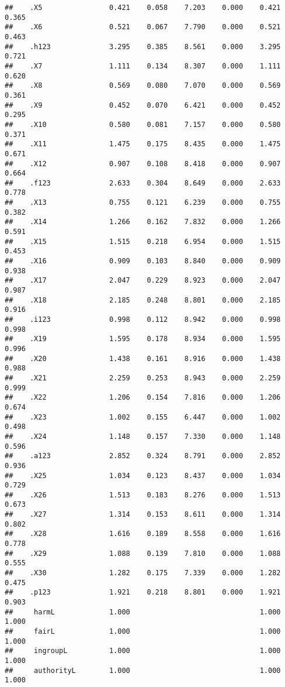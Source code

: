 \documentclass[english,man]{apa6}
\newcounter{author}
\theoremstyle{definition}
\theoremstyle{definition}
\theoremstyle{definition}
\theoremstyle{remark}
\begin{document}
\begin{verbatim}
##    .X5                0.421    0.058    7.203    0.000    0.421    0.365
##    .X6                0.521    0.067    7.790    0.000    0.521    0.463
##    .h123              3.295    0.385    8.561    0.000    3.295    0.721
##    .X7                1.111    0.134    8.307    0.000    1.111    0.620
##    .X8                0.569    0.080    7.070    0.000    0.569    0.361
##    .X9                0.452    0.070    6.421    0.000    0.452    0.295
##    .X10               0.580    0.081    7.157    0.000    0.580    0.371
##    .X11               1.475    0.175    8.435    0.000    1.475    0.671
##    .X12               0.907    0.108    8.418    0.000    0.907    0.664
##    .f123              2.633    0.304    8.649    0.000    2.633    0.778
##    .X13               0.755    0.121    6.239    0.000    0.755    0.382
##    .X14               1.266    0.162    7.832    0.000    1.266    0.591
##    .X15               1.515    0.218    6.954    0.000    1.515    0.453
##    .X16               0.909    0.103    8.840    0.000    0.909    0.938
##    .X17               2.047    0.229    8.923    0.000    2.047    0.987
##    .X18               2.185    0.248    8.801    0.000    2.185    0.916
##    .i123              0.998    0.112    8.942    0.000    0.998    0.998
##    .X19               1.595    0.178    8.934    0.000    1.595    0.996
##    .X20               1.438    0.161    8.916    0.000    1.438    0.988
##    .X21               2.259    0.253    8.943    0.000    2.259    0.999
##    .X22               1.206    0.154    7.816    0.000    1.206    0.674
##    .X23               1.002    0.155    6.447    0.000    1.002    0.498
##    .X24               1.148    0.157    7.330    0.000    1.148    0.596
##    .a123              2.852    0.324    8.791    0.000    2.852    0.936
##    .X25               1.034    0.123    8.437    0.000    1.034    0.729
##    .X26               1.513    0.183    8.276    0.000    1.513    0.673
##    .X27               1.314    0.153    8.611    0.000    1.314    0.802
##    .X28               1.616    0.189    8.558    0.000    1.616    0.778
##    .X29               1.088    0.139    7.810    0.000    1.088    0.555
##    .X30               1.282    0.175    7.339    0.000    1.282    0.475
##    .p123              1.921    0.218    8.801    0.000    1.921    0.903
##     harmL             1.000                               1.000    1.000
##     fairL             1.000                               1.000    1.000
##     ingroupL          1.000                               1.000    1.000
##     authorityL        1.000                               1.000    1.000

\end{verbatim}
\end{document}

